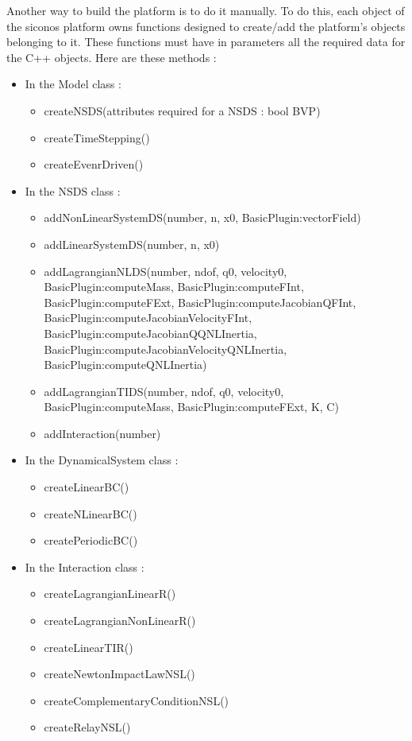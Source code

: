 Another way to build the platform is to do it manually.
To do this, each object of the \ac{siconos} platform owns functions designed to create/add the
platform's objects belonging to it. These functions must have in parameters all the required data for
the C++ objects. Here are these methods :
\begin{itemize}
        \item In the Model class :
        \begin{itemize}
                \item createNSDS(attributes required for a NSDS : bool BVP)
                \item createTimeStepping()
                \item createEvenrDriven()
        \end{itemize}
        
        \item In the NSDS class :
        \begin{itemize}
                \item addNonLinearSystemDS(number, n, x0, BasicPlugin:vectorField)
                \item addLinearSystemDS(number, n, x0)
                \item addLagrangianNLDS(number, ndof, q0, velocity0, BasicPlugin:computeMass,
                BasicPlugin:computeFInt, BasicPlugin:computeFExt,
                BasicPlugin:computeJacobianQFInt, BasicPlugin:computeJacobianVelocityFInt,
                BasicPlugin:computeJacobianQQNLInertia,
                BasicPlugin:computeJacobianVelocityQNLInertia, BasicPlugin:computeQNLInertia)
                \item addLagrangianTIDS(number, ndof, q0, velocity0, BasicPlugin:computeMass, BasicPlugin:computeFExt, K, C)
                \item addInteraction(number)
        \end{itemize}
        
        \item In the DynamicalSystem class :
        \begin{itemize}
                \item createLinearBC()
                \item createNLinearBC()
                \item createPeriodicBC()
        \end{itemize}
        
        \item In the Interaction class :
        \begin{itemize}
                \item createLagrangianLinearR()
                \item createLagrangianNonLinearR()
                \item createLinearTIR()
                \item createNewtonImpactLawNSL()
                \item createComplementaryConditionNSL()
                \item createRelayNSL()
        \end{itemize}
        

\end{itemize}
